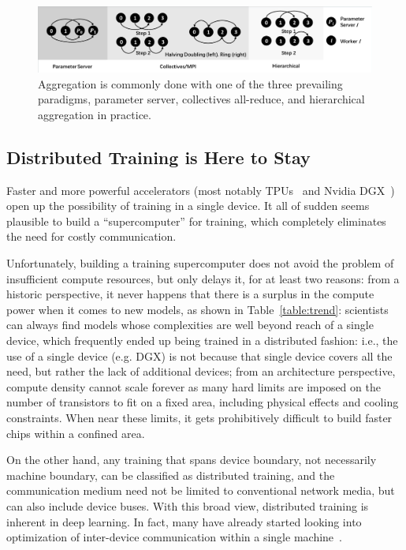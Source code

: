 \begin{figure}[t!]
	\centering
	\includegraphics[width=\linewidth, trim=2 3 3 3,clip]{Figures/aggregationapproaches.pdf}
	\caption{Aggregation is commonly done with one of the three prevailing paradigms, parameter server, collectives all-reduce, and hierarchical aggregation in practice.}
	\label{fig:aggregationapproaches}
\end{figure}

\subsection{Distributed Training is Here to Stay}
Faster and more powerful accelerators (most notably TPUs~\cite{Jouppi:2017:IPA:3079856.3080246} and Nvidia DGX~\cite{AIResear61:online}) open up the possibility of training in a single device. It all of sudden seems plausible to build a ``supercomputer'' for training, which completely eliminates the need for costly communication. 

Unfortunately, building a training supercomputer does not avoid the problem of insufficient compute resources, but only delays it, for at least two reasons: from a historic perspective, it never happens that there is a surplus in the compute power when it comes to new models, as shown in Table~\ref{table:trend}: scientists can always find models whose complexities are well beyond reach of a single device, which frequently ended up being trained in a distributed fashion: i.e., the use of a single device (e.g. DGX) is not because that single device covers all the need, but rather the lack of additional devices; from an architecture perspective, compute density cannot scale forever as many hard limits are imposed on the number of transistors to fit on a fixed area, including physical effects and cooling constraints. When near these limits, it gets prohibitively difficult to build faster chips within a confined area. 

On the other hand, any training that spans device boundary, not necessarily machine boundary, can be classified as distributed training, and the communication medium need not be limited to conventional network media, but can also include device buses. With this broad view, distributed training is inherent in deep learning. In fact, many have already started looking into optimization of inter-device communication within a single machine~\cite{wang2019blink}. %

